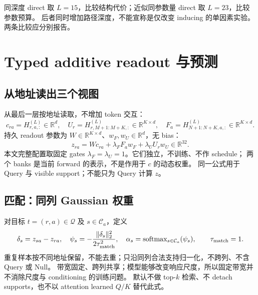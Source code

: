 \documentclass[11pt,UTF8,fontset=fandol]{ctexart}
\newcommand{\R}{\mathbb R}\newcommand{\V}{\mathcal V}\newcommand{\Q}{\mathcal Q}
\newcommand{\sm}{\operatorname{softmax}}\newcommand{\OMAB}{\operatorname{OMAB}}
\begin{document}
同深度 direct 取 $L=15$，比较结构代价；近似同参数量 direct 取 $L=23$，比较参数预算。
后者同时增加路径深度，不能宣称是仅改变 inducing 的单因素实验。两条比较应分别报告。

\section{Typed additive readout 与预测}
\label{sec:readout}

\subsection{从地址读出三个视图}
从最后一层按地址读取，不增加 token 交互：
\begin{equation}
 c_{ra}=H^{(L)}_{r,a,:}\in\R^d,\quad
 U_r=H^{(L)}_{r,M+1:M+K,:}\in\R^{K\times d},\quad
 F_a=H^{(L)}_{N+1:N+K,a,:}\in\R^{K\times d}.
 \label{eq:views}
\end{equation}
持久 readout 参数为 $W\in\R^{K\times d}$、$w_F,w_U\in\R^d$，无 bias：
\begin{equation}
 \boxed{z_{ra}=Wc_{ra}+\lambda_F F_aw_F+\lambda_U U_rw_U\in\R^{32}.}
 \label{eq:response}
\end{equation}
本文完整配置取固定 gates $\lambda_F=\lambda_U=1$。它们独立，不训练、不作 schedule；
两个 banks 是当前 forward 的表示，不是作用于 $c$ 的动态权重。
同一公式用于 Query 与 visible support；不能只为 Query 计算 $z$。

\subsection{匹配：同列 Gaussian 权重}
对目标 $t=(r,a)\in\Q$ 及 $s\in\mathcal C_a$，定义
\begin{equation}
 \delta_s=z_{sa}-z_{ra},\quad
 \psi_s=-\frac{\|\delta_s\|_2^2}{2\tau_{\rm match}^2},\quad
 \alpha_s=\sm_{s\in\mathcal C_a}(\psi_s),\qquad\tau_{\rm match}=1.
 \label{eq:matching}
\end{equation}
重复样本按不同地址保留，不能去重；只沿同列合法支持归一化，不跨列、不含 Query 或 Null。
带宽固定、跨列共享；模型能够改变响应尺度，所以固定带宽并不消除尺度与 conditioning 的训练问题。
默认不做 top-$k$ 检索、不 detach supports，也不以 attention learned $Q/K$ 替代此式。
\end{document}

